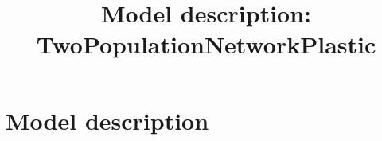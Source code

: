 \documentclass[10pt,a4paper,twoside,american]{article}
\begin{document}
\title{Model description:\\{\bf TwoPopulationNetworkPlastic}}
\author{}
\date{}
\maketitle
\thispagestyle{empty}

\def\marg{1ex}
\setlength{\parindent}{0pt}

\section{Model description}
\label{sec:model_description}
\renewcommand{\arraystretch}{1.2}
\end{document}
